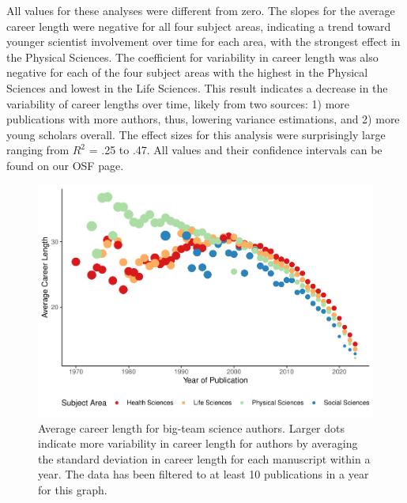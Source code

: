 \documentclass[
  man,floatsintext]{apa6}
\begin{document}
All values for these analyses were different from zero. The slopes for
the average career length were negative for all four subject areas,
indicating a trend toward younger scientist involvement over time for
each area, with the strongest effect in the Physical Sciences. The
coefficient for variability in career length was also negative for each
of the four subject areas with the highest in the Physical Sciences and
lowest in the Life Sciences. This result indicates a decrease in the
variability of career lengths over time, likely from two sources: 1)
more publications with more authors, thus, lowering variance
estimations, and 2) more young scholars overall. The effect sizes for
this analysis were surprisingly large ranging from \(R^2\) = .25 to .47.
All values and their confidence intervals can be found on our OSF page.

\begin{figure}
\centering
\includegraphics{manuscript_scopus_files/figure-latex/fig-career-1.pdf}
\caption{\label{fig:fig-career}Average career length for big-team science authors. Larger dots indicate more variability in career length for authors by averaging the standard deviation in career length for each manuscript within a year. The data has been filtered to at least 10 publications in a year for this graph.}
\end{figure}
\end{document}
